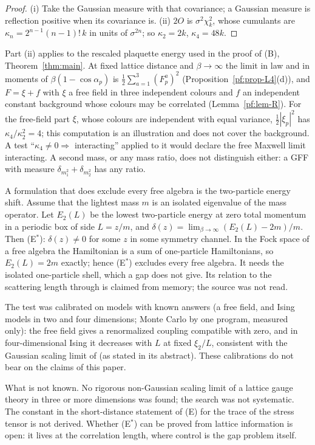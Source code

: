 \begin{proof}
(i) Take the Gaussian measure with that covariance; a Gaussian measure is reflection positive
when its covariance is. (ii) $2O$ is $\sigma^2\chi^2_k$, whose cumulants are
$\kappa_n=2^{n-1}(n-1)!\,k$ in units of $\sigma^{2n}$; so $\kappa_2=2k$, $\kappa_4=48k$.
\end{proof}

Part (ii) applies to the rescaled plaquette energy used in the proof of (B),
Theorem~\ref{thm:main}. At fixed lattice distance and
$\beta\to\infty$ the limit in law and in moments of $\beta(1-\cos\alpha_p)$ is
$\frac12\sum_{a=1}^3(F^a_p)^2$ (Proposition~\ref{pf:prop-L4}(d)), and $F=\xi+f$ with $\xi$ a free
field in three independent colours and $f$ an independent constant background whose colours may be
correlated (Lemma~\ref{pf:lem-R}). For the free-field part $\xi$, whose colours are independent
with equal variance, $\frac12|\xi_p|^2$ has $\kappa_4/\kappa_2^2=4$; this computation is an
illustration and does not cover the background. A test ``$\kappa_4\ne0\Rightarrow$ interacting'' applied to it would
declare the free Maxwell limit interacting. A second mass, or any mass ratio, does not
distinguish either: a GFF with measure $\delta_{m_1^2}+\delta_{m_2^2}$ has any ratio.

A formulation that does exclude every free algebra is the two-particle energy shift. Assume
that the lightest mass $m$ is an isolated eigenvalue of the mass operator. Let $E_2(L)$ be the
lowest two-particle energy at zero total momentum in a periodic box of side $L=z/m$, and
$\delta(z)=\lim_{\beta\to\infty}(E_2(L)-2m)/m$. Then (E$^*$): $\delta(z)\ne0$ for some $z$ in some
symmetry channel. In the Fock space of a free algebra the Hamiltonian is a sum of one-particle
Hamiltonians, so $E_2(L)=2m$ exactly; hence (E$^*$) excludes every free algebra. It needs the
isolated one-particle shell, which a gap does not give. Its relation to the scattering length
through \cite{LW86} is claimed from memory; the source was not read.

The test was calibrated on models with known answers (a free field, and Ising models in two and
four dimensions; Monte Carlo by one program, measured only): the free field gives a renormalized
coupling compatible with zero, and in four-dimensional Ising it decreases with $L$ at fixed
$\xi_2/L$, consistent with the Gaussian scaling limit of \cite{ADC21} (as stated in its abstract).
These calibrations do not bear on the claims of this paper.

What is not known. No rigorous non-Gaussian scaling limit of a lattice gauge theory in three or
more dimensions was found; the search was not systematic. The constant
in the short-distance statement of (E) for the trace of the stress tensor is not derived. Whether
(E$^*$) can be proved from lattice information is open: it lives at the correlation length,
where control is the gap problem itself.
